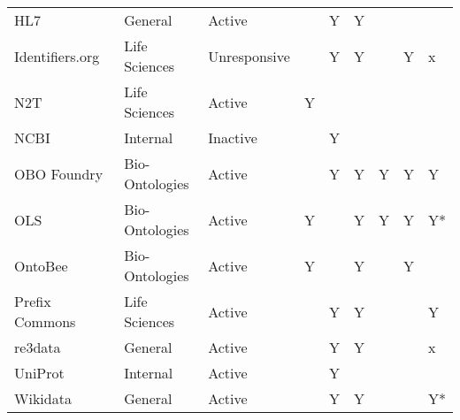 \begin{table}
\begin{tabular}{lllllllll}
                  HL7~\cite{Bender2013} &         General &       Active &                           &                      Y &                              Y &                        &                      &                        \\
        Identifiers.org~\cite{Juty2012} &   Life Sciences & Unresponsive &                           &                      Y &                              Y &                        &                    Y &                      x \\
             N2T~\cite{Wimalaratne2018} &   Life Sciences &       Active &                         Y &                        &                                &                        &                      &                        \\
                  NCBI~\cite{Clark2016} &        Internal &     Inactive &                           &                      Y &                                &                        &                      &                        \\
         OBO Foundry~\cite{Jackson2021} &  Bio-Ontologies &       Active &                           &                      Y &                              Y &                      Y &                    Y &                      Y \\
                   OLS~\cite{Cote2006a} &  Bio-Ontologies &       Active &                         Y &                        &                              Y &                      Y &                    Y &                     Y* \\
                 OntoBee~\cite{Ong2017} &  Bio-Ontologies &       Active &                         Y &                        &                              Y &                        &                    Y &                        \\
    Prefix Commons~\cite{prefixcommons} &   Life Sciences &       Active &                           &                      Y &                              Y &                        &                      &                      Y \\
              re3data~\cite{Pampel2013} &         General &       Active &                           &                      Y &                              Y &                        &                      &                      x \\
             UniProt~\cite{Bateman2021} &        Internal &       Active &                           &                      Y &                                &                        &                      &                        \\
        Wikidata~\cite{Waagmeester2020} &         General &       Active &                           &                      Y &                              Y &                        &                      &                     Y* \\
\bottomrule
\end{tabular}
\end{table}
